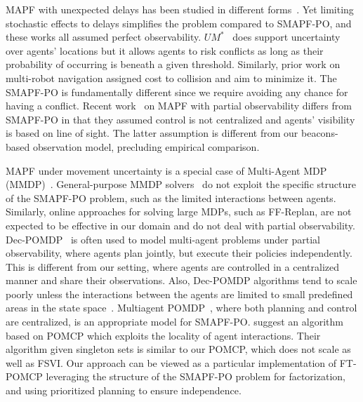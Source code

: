 \documentclass[letterpaper]{article} %
\begin{document}
MAPF with unexpected delays has been studied in different forms~\cite{atzmon2020probabilistic,shahar2021safe,atzmon2020robust,ma2017multiAgent}. Yet limiting stochastic effects to delays simplifies the problem compared to SMAPF-PO, and these works all assumed perfect observability.
$UM^*$~\cite{wagner2017path} does support uncertainty over agents' locations but it allows agents to risk conflicts as long as their probability of occurring is beneath a given threshold. Similarly, prior work on multi-robot navigation assigned cost to collision and aim to minimize it.
The SMAPF-PO is fundamentally different since we require avoiding any chance for having a conflict. %
Recent work~\cite{davydov2021q} on MAPF with partial observability differs from SMAPF-PO in that they assumed control is not centralized and agents' visibility is based on line of sight. The latter assumption is different from our beacons-based observation model, precluding empirical comparison.


MAPF under movement uncertainty is a special case of Multi-Agent MDP (MMDP)~\cite{boutilier1996planning}.
General-purpose MMDP solvers~\cite{de2021constrained} do not exploit the specific structure of the SMAPF-PO problem, such as the limited interactions between agents. Similarly, online approaches for solving large MDPs, such as FF-Replan\cite{yoon2007ff}, are not expected to be effective in our domain and do not deal with partial observability.
Dec-POMDP~\cite{oliehoek2012decentralized} is often used to model multi-agent problems under partial observability, where agents plan jointly, but execute their policies independently.
This is different from our setting, where agents are controlled in a centralized manner and share their observations.
Also, Dec-POMDP algorithms tend to scale poorly unless the interactions between the agents are limited to small predefined areas in the state space~\cite{melo2009learning}.
Multiagent POMDP~\cite{oliehoek2017madp}, where both planning and control are centralized, is an appropriate model for SMAPF-PO.  \citet{amato2015scalable} suggest an algorithm based on POMCP which exploits the locality of agent interactions.
Their algorithm given singleton sets is similar to our POMCP, which does not scale as well as FSVI.
Our approach can be viewed as a particular implementation of FT-POMCP leveraging the structure of the SMAPF-PO problem for factorization, and using prioritized planning to ensure independence.
\end{document}
